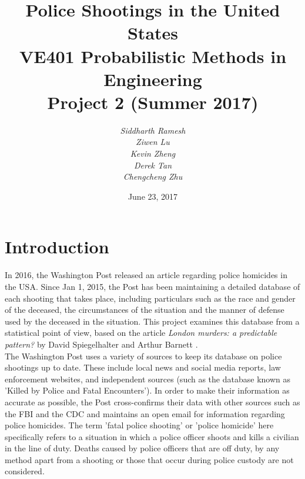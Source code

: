 \documentclass[12pt, titlepage]{article}
\begin{document}
\title{\LARGE \textbf{Police Shootings in the United States} \\
	\vspace{2ex}
	\large VE401 Probabilistic Methods in Engineering \\
    Project 2 (Summer 2017)}
\date{June 23, 2017}
\author{\textit{Siddharth Ramesh}\\ \textit{Ziwen Lu}\\ \textit{Kevin Zheng}\\ \textit{Derek Tan}\\ \textit{Chengcheng Zhu}}

\maketitle



\pagebreak
\tableofcontents
\pagebreak
\setcounter{page}{1}

\section{Introduction}

In 2016, the Washington Post \cite{washington} released an article regarding police homicides in the USA. Since Jan 1, 2015, the Post has been maintaining a detailed database of each shooting that takes place, including particulars such as the race and gender of the deceased, the circumstances of the situation and the manner of defense used by the deceased in the situation. This project examines this database from a statistical point of view, based on the article \textit{London murders: a predictable pattern?} by David Spiegelhalter and Arthur Barnett \cite{barnett}.\\
The Washington Post uses a variety of sources to keep its database on police shootings up to date. These include local news and social media reports, law enforcement websites, and independent sources (such as the database known as 'Killed by Police and Fatal Encounters'). In order to make their information as accurate as possible, the Post cross-confirms their data with other sources such as the FBI and the CDC and maintains an open email for information regarding police homicides. The term 'fatal police shooting' or 'police homicide' here specifically refers to a situation in which a police officer shoots and kills a civilian in the line of duty. Deaths caused by police officers that are off duty, by any method apart from a shooting or those that occur during police custody are not considered.
\end{document}
